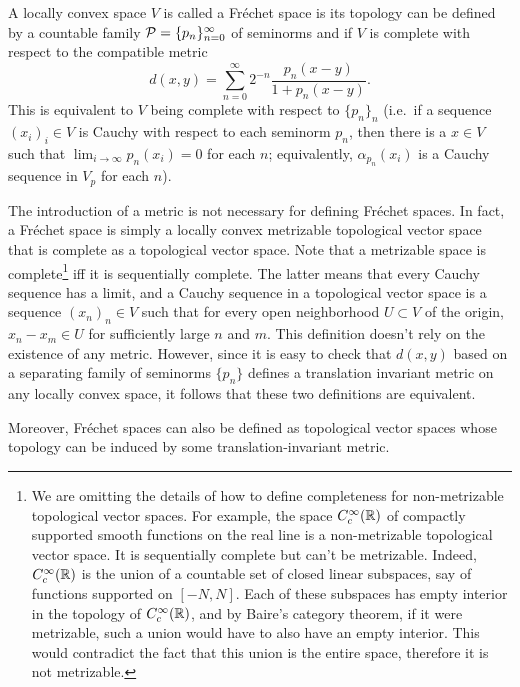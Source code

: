 \begin{defn}
    A locally convex space $V$ is called a Fr\'echet space is its topology can be defined by a countable family $\mathcal{P}=\{p_n\}_{n=0}^\infty$ of seminorms and if $V$ is complete with respect to the compatible metric
    \[d(x,y)=\sum_{n=0}^\infty 2^{-n}\frac{p_n(x-y)}{1+p_n(x-y)}.\]
    This is equivalent to $V$ being complete with respect to $\{p_n\}_n$ (i.e.\ if a sequence $(x_i)_i\in V$ is Cauchy with respect to each seminorm $p_n$, then there is a $x\in V$ such that $\lim_{i\to\infty} p_n(x_i)=0$ for each $n$; equivalently, $\alpha_{p_n}(x_i)$ is a Cauchy sequence in $V_p$ for each $n$).
\end{defn}
\begin{rem}
    The introduction of a metric is not necessary for defining Fr\'echet spaces. In fact, a Fr\'echet space is simply a locally convex metrizable topological vector space that is complete as a topological vector space. Note that a metrizable space is complete\footnote{We are omitting the details of how to define completeness for non-metrizable topological vector spaces. For example, the space $C^\infty_c(\mathbb{R})$ of compactly supported smooth functions on the real line is a non-metrizable topological vector space. It is sequentially complete but can't be metrizable. Indeed, $C^\infty_c(\mathbb{R})$ is the union of a countable set of closed linear subspaces, say of functions supported on $[-N,N]$. Each of these subspaces has empty interior in the topology of $C^\infty_c(\mathbb{R})$, and by Baire's category theorem, if it were metrizable, such a union would have to also have an empty interior. This would contradict the fact that this union is the entire space, therefore it is not metrizable.} iff it is sequentially complete. The latter means that every Cauchy sequence has a limit, and a Cauchy sequence in a topological vector space is a sequence $(x_n)_n\in V$ such that for every open neighborhood $U\subset V$ of the origin, $x_n-x_m\in U$ for sufficiently large $n$ and $m$. This definition doesn't rely on the existence of any metric. However, since it is easy to check that $d(x,y)$ based on a separating family of seminorms $\{p_n\}$ defines a translation invariant metric on any locally convex space, it follows that these two definitions are equivalent. 
    
    Moreover, Fr\'echet spaces can also be defined as topological vector spaces whose topology can be induced by some translation-invariant metric.
\end{rem}

